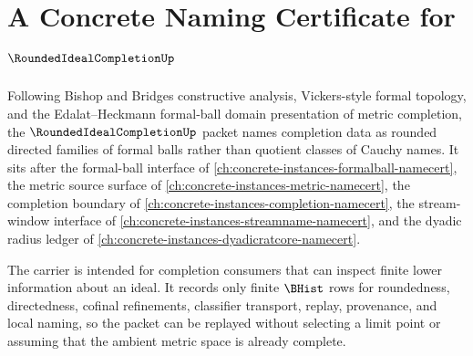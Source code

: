 \chapter{A Concrete Naming Certificate for $\RoundedIdealCompletionUp$}
\label{ch:concrete-instances-rounded-ideal-completion-namecert}

Following Bishop and Bridges constructive analysis, Vickers-style formal topology, and the Edalat--Heckmann formal-ball domain presentation of metric completion, the $\RoundedIdealCompletionUp$ packet names completion data as rounded directed families of formal balls rather than quotient classes of Cauchy names. It sits after the formal-ball interface of \autoref{ch:concrete-instances-formalball-namecert}, the metric source surface of \autoref{ch:concrete-instances-metric-namecert}, the completion boundary of \autoref{ch:concrete-instances-completion-namecert}, the stream-window interface of \autoref{ch:concrete-instances-streamname-namecert}, and the dyadic radius ledger of \autoref{ch:concrete-instances-dyadicratcore-namecert}.

The carrier is intended for completion consumers that can inspect finite lower information about an ideal. It records only finite $\BHist$ rows for roundedness, directedness, cofinal refinements, classifier transport, replay, provenance, and local naming, so the packet can be replayed without selecting a limit point or assuming that the ambient metric space is already complete.

